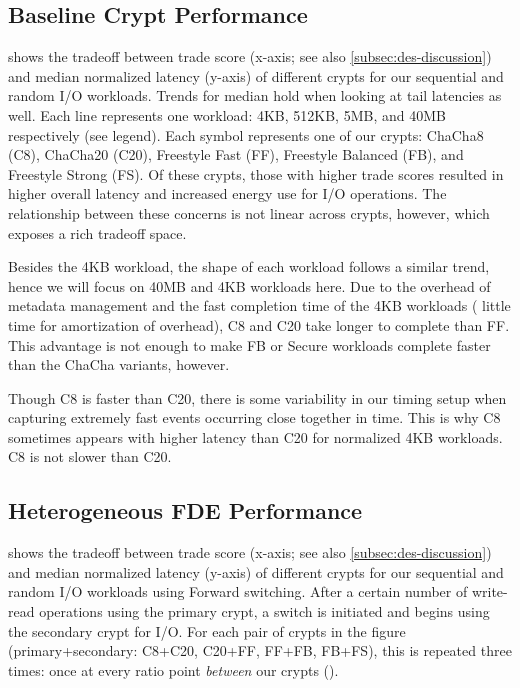 \subsection{Baseline Crypt Performance}\label{subsec:eval-baseline}



 shows the tradeoff between trade score (x-axis; see
also \cref{subsec:des-discussion}) and median normalized latency (y-axis) of
different crypts for our sequential and random I/O workloads. Trends for median
hold when looking at tail latencies as well. Each line represents one workload:
4KB, 512KB, 5MB, and 40MB respectively (see legend). Each symbol represents one
of our crypts: ChaCha8 (C8), ChaCha20 (C20), Freestyle Fast (FF), Freestyle
Balanced (FB), and Freestyle Strong (FS). Of these crypts, those with higher
trade scores resulted in higher overall latency and increased energy use for I/O
operations. The relationship between these concerns is not linear across crypts,
however, which exposes a rich tradeoff space.

Besides the 4KB workload, the shape of each workload follows a similar trend,
hence we will focus on 40MB and 4KB workloads here. Due to the overhead of
metadata management and the fast completion time of the 4KB workloads (\ie
little time for amortization of overhead), C8 and C20 take longer to complete
than FF. This advantage is not enough to make FB or Secure workloads complete
faster than the ChaCha variants, however.

Though C8 is faster than C20, there is some variability in our timing setup when
capturing extremely fast events occurring close together in time. This is why C8
sometimes appears with higher latency than C20 for normalized 4KB workloads. C8
is not slower than C20.


\subsection{Heterogeneous FDE Performance}\label{subsec:eval-dynamic}



 shows the tradeoff between trade score (x-axis; see also
\cref{subsec:des-discussion}) and median normalized latency (y-axis) of
different crypts for our sequential and random I/O workloads using Forward
switching. After a certain number of write-read operations using the primary
crypt, a switch is initiated and \sys begins using the secondary crypt for I/O.
For each pair of crypts in the figure (primary+secondary: C8+C20, C20+FF, FF+FB,
FB+FS), this is repeated three times: once at every ratio point {\em between}
our crypts ().

